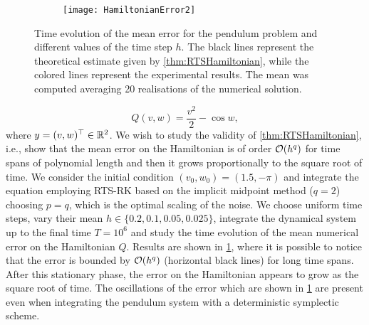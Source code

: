 \documentclass[10pt]{article}
\begin{document}
\begin{figure}[t]
	\begin{center}
	\begin{subfigure}{0.7\linewidth}
	\texttt{[image: HamiltonianError2]} 
	\end{subfigure}
	\begin{subfigure}{0.14\linewidth}
	\end{subfigure}
	\end{center}

	\caption{Time evolution of the mean error for the pendulum problem and different values of the time step $h$. The black lines represent the theoretical estimate given by \cref{thm:RTSHamiltonian}, while the colored lines represent the experimental results. The mean was computed averaging 20 realisations of the numerical solution.}
	\label{fig:MeanTime}	
\end{figure}
\begin{equation}
Q(v, w) = \frac{v^2}{2} - \cos w,
\end{equation}
where $y = (v, w)^\top \in \mathbb{R}^2$. We wish to study the validity of \cref{thm:RTSHamiltonian}, i.e., show that the mean error on the Hamiltonian is of order $\mathcal{O}(h^q)$ for time spans of polynomial length and then it grows proportionally to the square root of time. We consider the initial condition $(v_0, w_0) = (1.5, -\pi)$ and integrate the equation employing RTS-RK based on the implicit midpoint method ($q = 2$) choosing $p = q$, which is the optimal scaling of the noise. We choose uniform time steps, vary their mean $h \in \{0.2, 0.1, 0.05, 0.025\}$, integrate the dynamical system up to the final time $T = 10^6$ and study the time evolution of the mean numerical error on the Hamiltonian $Q$. Results are shown in \cref{fig:MeanTime}, where it is possible to notice that the error is bounded by $\mathcal{O}(h^q)$ (horizontal black lines) for long time spans. After this stationary phase, the error on the Hamiltonian appears to grow as the square root of time. The oscillations of the error which are shown in \cref{fig:MeanTime} are present even when integrating the pendulum system with a deterministic symplectic scheme. 
\end{document}
